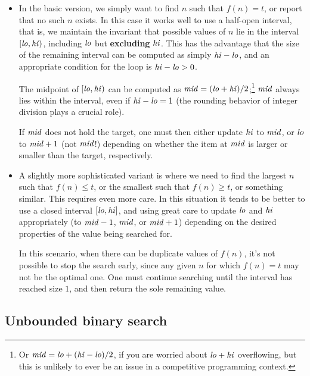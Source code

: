 \documentclass[10pt]{book}
\newif\iftodos
\newcommand{\todo}[1]{\iftodos\textcolor{red}{[TODO: #1]}\fi}
\begin{document}
\begin{itemize}
\item In the basic version, we simply want to find $n$ such that
  $f(n) = t$, or report that no such $n$ exists.  In this case it
  works well to use a half-open interval, that is, we maintain the
  invariant that possible values of $n$ lie in the interval
  $[\mathit{lo}, \mathit{hi})$, including $\mathit{lo}$ but \textbf{excluding}
  $\mathit{hi}$.  This has the advantage that the size of the
  remaining interval can be computed as simply $\mathit{hi} - \mathit{lo}$,
  and an appropriate condition for the loop is $\mathit{hi} - \mathit{lo} > 0$.

  The midpoint of $[\mathit{lo}, \mathit{hi})$ can be computed as
  $\mathit{mid} = (\mathit{lo} + \mathit{hi})/2$;\footnote{Or
    $\mathit{mid} = \mathit{lo} + (\mathit{hi} - \mathit{lo})/2$, if you are worried about
    $\mathit{lo} + \mathit{hi}$ overflowing, but this is unlikely to ever be an
    issue in a competitive programming context.} $\mathit{mid}$ always
  lies within the interval, even if $\mathit{hi} - \mathit{lo} = 1$ (the rounding
  behavior of integer division plays a crucial role).

  If $\mathit{mid}$ does not hold the target, one must then either update
  $\mathit{hi}$ to $\mathit{mid}$, or $\mathit{lo}$ to $\mathit{mid} + 1$ (not $\mathit{mid}$!) depending
  on whether the item at $\mathit{mid}$ is larger or smaller than the target,
  respectively.

  \todo{Example code}

\item A slightly more sophisticated variant is where we need to find
  the largest $n$ such that $f(n) \leq t$, or the smallest such that
  $f(n) \geq t$, or something similar. This requires even more care.
  In this situation it tends to be better to use a closed interval
  $[\mathit{lo}, \mathit{hi}]$, and using great care to update $\mathit{lo}$ and $\mathit{hi}$
  appropriately (to $\mathit{mid} - 1$, $\mathit{mid}$, or $\mathit{mid}+1$) depending on
  the desired properties of the value being searched for.

  In this scenario, when there can be duplicate values of $f(n)$, it's
  not possible to stop the search early, since any given $n$ for which
  $f(n) = t$ may not be the optimal one.  One must continue searching
  until the interval has reached size $1$, and then return the sole
  remaining value.

  \todo{Example code}
\end{itemize}

\subsection*{Unbounded binary search}
\end{document}
